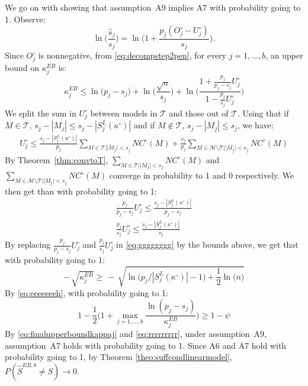 \documentclass[aos]{imsart}
\theoremstyle{plain}
\newcommand{\M}{\mathcal{M}}
\newcommand{\T}{\mathcal{T}}
\begin{document}
We go on with showing that assumption~A9 implies A7 with probability going to 1. Observe:
$$\ln\Big(\frac{\widehat{s}_j}{s_j}\Big)=\ln\Big(1+\frac{p_j(O^{\circ}_j-U^{\circ}_j)}{s_j}\Big) .$$
Since $O_j^{\circ}$ is nonnegative, from \eqref{eq:decompstep2pen}, for every $j=1,\ldots,b$, an upper bound on $\kappa^{EB}_j$ is:
\begin{equation}\label{eq:gggggggg}
    \kappa^{EB}_j \leq \ln\big(p_j-s_j\big)+\ln\Big(\frac{\sqrt{n}}{s_j}\Big)+\ln\bigg(\frac{1+\frac{p_j}{p_j-s_j}U^{\circ}_j}{1-\frac{p_j}{s_j}U^{\circ}_j}\bigg)
\end{equation}
We split the sum in $U^{\circ}_j$ between models in $\T$ and those out of $\T$. Using that if $M\in \T$, $s_j-|M_j|\leq s_j-|S^{L}_j(\kappa^{\circ})|$ and if $M\not\in \T$, $s_j-|M_j|\leq s_j$, we have:
\begin{eqnarray*}
    U^{\circ}_j \leq \frac{s_j-|S^{L}_j(\kappa^{\circ})|}{p_j}\sum_{M \in \T | |M_j| < s_j}NC^{\circ}(M)+  \frac{s_j}{p_j}\sum_{M \in \M \setminus \T| |M_j| < s_j}NC^{\circ}(M)
\end{eqnarray*}
By Theorem~\ref{thm:convtoT}, $\sum_{M \in  \T| |M_j| < s_j}NC^{\circ}(M)$ and $\sum_{M \in \M \setminus \T| |M_j| < s_j}NC^{\circ}(M)$ converge in probability to 1 and 0 respectively. We then get than with probability going to 1:
\begin{eqnarray*}
    \frac{p_j}{p_j-s_j}U^{\circ}_j \leq \frac{s_j-|S^{L}_j(\kappa^{\circ})|}{p_j-s_j}\\
    \frac{p_j}{s_j}U^{\circ}_j \leq  \frac{s_j-|S^{L}_j(\kappa^{\circ})|}{s_j}
\end{eqnarray*}
By replacing $\frac{p_j}{p_j-s_j}U^{\circ}_j$ and $\frac{p_j}{s_j}U^{\circ}_j$ in \eqref{eq:gggggggg} by the bounds above, we get that  with probability going to 1:
\begin{equation}\label{eq:finalupperboundkappaj}
  - \,\sqrt{\kappa^{EB}_j} \geq  \,- \,\sqrt{\ln\big(p_j/|S^{L}_j(\kappa^{\circ})|-1\big)+\frac{1}{2}\ln\Big(n\Big) }
\end{equation}
By \eqref{eq:eeeeeeeh}, with probability going to 1:
\begin{equation}\label{eq:rrrrrrrrr}
    1-\frac12\Big(1+\max_{j=1, \ldots,b}\frac{\ln(p_j-s_j)}{\kappa^{EB}_j}\Big) \geq 1-\psi
\end{equation}
By \eqref{eq:finalupperboundkappaj} and \eqref{eq:rrrrrrrrr}, under assumption~A9, assumption~A7 holds with probability going to 1. Since A6 and A7 hold with probability going to 1, by Theorem \ref{theo:suffcondlinearmodel}, $P(\hat{S}^{EB,b}\neq S) \to 0$.
\end{document}
